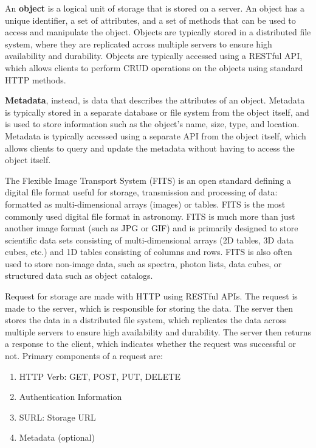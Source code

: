 An \textbf{object} is a logical unit of storage that is stored on a server. An object has a unique identifier, a set of attributes, and a set of methods that can be used to access and manipulate the object. Objects are typically stored in a distributed file system, where they are replicated across multiple servers to ensure high availability and durability. Objects are typically accessed using a RESTful API, which allows clients to perform CRUD operations on the objects using standard HTTP methods.

\textbf{Metadata}, instead, is data that describes the attributes of an object. Metadata is typically stored in a separate database or file system from the object itself, and is used to store information such as the object's name, size, type, and location. Metadata is typically accessed using a separate API from the object itself, which allows clients to query and update the metadata without having to access the object itself.

\begin{observationblock}
    The Flexible Image Transport System (FITS) is an open standard defining a digital file format useful for storage, transmission and processing of data: formatted as multi-dimensional arrays (images) or tables. FITS is the most commonly used digital file format in astronomy. FITS is much more than just another image format (such as JPG or GIF) and is primarily designed to store scientific data sets consisting of multi-dimensional arrays (2D tables, 3D data cubes, etc.) and 1D tables consisting of columns and rows. FITS is also often used to store non-image data, such as spectra, photon lists, data cubes, or structured data such as object catalogs.
\end{observationblock}

Request for storage are made with HTTP using RESTful APIs. The request is made to the server, which is responsible for storing the data. The server then stores the data in a distributed file system, which replicates the data across multiple servers to ensure high availability and durability. The server then returns a response to the client, which indicates whether the request was successful or not. Primary components of a request are:
\begin{enumerate}
    \item HTTP Verb: GET, POST, PUT, DELETE
    \item Authentication Information 
    \item SURL: Storage URL
    \item Metadata (optional)
\end{enumerate}

